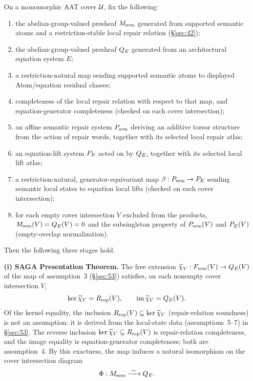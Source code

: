 \begin{theorem}\label{thm:central}
On a monomorphic AAT cover $\mathcal{U}$, fix the following:
\begin{enumerate}
\item the abelian-group-valued presheaf $M_{\mathrm{sem}}$ generated from
supported semantic atoms and a restriction-stable local repair relation
(\S\ref{sec:42});
\item the abelian-group-valued presheaf $Q_{E}$ generated from an
architectural equation system $E$;
\item a restriction-natural map sending supported semantic atoms to
displayed Atom/equation residual classes;
\item completeness of the local repair relation with respect to that
map, and equation-generator completeness (checked on each cover
intersection);
\item an affine semantic repair system $P_{\mathrm{sem}}$ deriving an additive
torsor structure from the action of repair words, together with its
selected local repair atlas;
\item an equation-lift system $P_{E}$ acted on by $Q_{E}$, together with
its selected local lift atlas;
\item a restriction-natural, generator-equivariant map
$\beta:P_{\mathrm{sem}}\to P_{E}$ sending semantic local states to equation local
lifts (checked on each cover intersection);
\item for each empty cover intersection $V$ excluded from the products,
$M_{\mathrm{sem}}(V)=Q_{E}(V)=0$ and the subsingleton property of $P_{\mathrm{sem}}(V)$ and
$P_{E}(V)$ (empty-overlap normalization).
\end{enumerate}
Then the following three stages hold.

\textbf{(i) SAGA Presentation Theorem.} The free extension
$\widetilde\chi_V:F_{\mathrm{sem}}(V)\to Q_{E}(V)$ of the map of assumption~3
(\S\ref{sec:53}) satisfies, on each nonempty cover intersection $V$,
\[
\ker \widetilde\chi_V=R_{\mathrm{rep}}(V),
\qquad
\operatorname{im}\widetilde\chi_V=Q_{E}(V).
\]
Of the kernel equality, the inclusion
$R_{\mathrm{rep}}(V)\subseteq\ker\widetilde\chi_V$ (repair-relation soundness) is
not an assumption: it is derived from the local-state data
(assumptions~5--7) in \S\ref{sec:53}. The reverse inclusion
$\ker\widetilde\chi_V\subseteq R_{\mathrm{rep}}(V)$ is repair-relation
completeness, and the image equality is equation-generator
completeness; both are assumption~4. By this exactness, the map induces
a natural isomorphism on the cover intersection diagram
\[
\Phi:M_{\mathrm{sem}}\xrightarrow{\ \sim\ }Q_{E}.
\]


\end{theorem}
